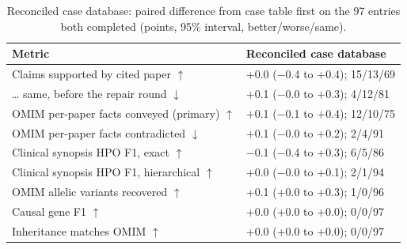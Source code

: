 \documentclass{article} %
\begin{document}
\begin{table}[!htbp]
\caption{Reconciled case database: paired difference from case table first on the 97 entries both completed (points, 95\% interval, better/worse/same).}
\label{tab:app_recon}
\scriptsize
\begin{tabularx}{\linewidth}{>{\raggedright\arraybackslash}p{4.0cm}>{\centering\arraybackslash}X}
\toprule
Metric & Reconciled case database \\
\midrule
Claims supported by cited paper $\uparrow$ & +0.0 ($-$0.4 to +0.4); 15/13/69 \\
\ldots{} same, before the repair round $\downarrow$ & +0.1 ($-$0.0 to +0.3); 4/12/81 \\
OMIM per-paper facts conveyed (primary) $\uparrow$ & +0.1 ($-$0.1 to +0.4); 12/10/75 \\
OMIM per-paper facts contradicted $\downarrow$ & +0.1 ($-$0.0 to +0.2); 2/4/91 \\
Clinical synopsis HPO F1, exact $\uparrow$ & $-$0.1 ($-$0.4 to +0.3); 6/5/86 \\
Clinical synopsis HPO F1, hierarchical $\uparrow$ & +0.0 ($-$0.0 to +0.1); 2/1/94 \\
OMIM allelic variants recovered $\uparrow$ & +0.1 (+0.0 to +0.3); 1/0/96 \\
Causal gene F1 $\uparrow$ & +0.0 (+0.0 to +0.0); 0/0/97 \\
Inheritance matches OMIM $\uparrow$ & +0.0 (+0.0 to +0.0); 0/0/97 \\
\bottomrule
\end{tabularx}
\end{table}
\end{document}
